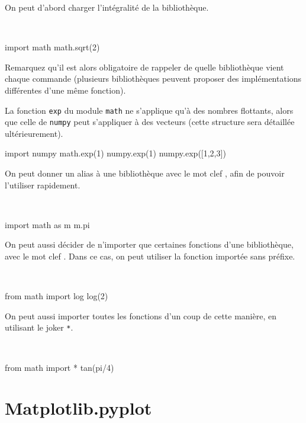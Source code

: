 On peut d'abord charger l'intégralité de la bibliothèque.
\begin{ex}~
\begin{pyconsole}
import math
math.sqrt(2)
\end{pyconsole}
\end{ex}
Remarquez qu'il est alors obligatoire de rappeler de quelle bibliothèque vient chaque commande (plusieurs bibliothèques peuvent proposer des implémentations différentes d'une même fonction).
\begin{ex}
La fonction \texttt{exp} du module \texttt{math} ne s'applique qu'à des nombres flottants, alors que celle de \texttt{numpy} peut s'appliquer à des vecteurs (cette structure sera détaillée ultérieurement). 
\begin{pyconsole}
import numpy
math.exp(1)
numpy.exp(1)
numpy.exp([1,2,3])
\end{pyconsole}
\end{ex}
On peut donner un alias à une bibliothèque avec le mot clef , afin de pouvoir l'utiliser rapidement. 
\begin{ex}~
\begin{pyconsole}
import math as m
m.pi
\end{pyconsole}
\end{ex}
On peut aussi décider de n'importer que certaines fonctions d'une bibliothèque, avec le mot clef . Dans ce cas, on peut utiliser la fonction importée sans préfixe. 
\begin{ex}~
\begin{pyconsole}
from math import log
log(2)
\end{pyconsole}
\end{ex}
On peut aussi importer toutes les fonctions d'un coup de cette manière, en utilisant le joker \texttt{*}.
\begin{ex}~
\begin{pyconsole}
from math import *
tan(pi/4)
\end{pyconsole}
\end{ex}

\section{Matplotlib.pyplot}

